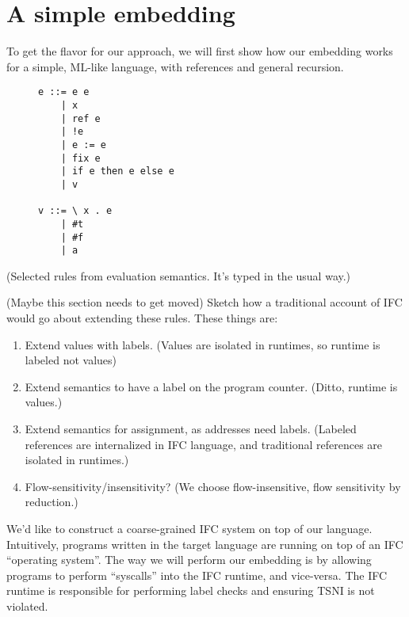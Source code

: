 \section{A simple embedding}
\label{sec:example}

To get the flavor for our approach, we will first show how our embedding
works for a simple, ML-like language, with references and general recursion.

\begin{figure}
\begin{verbatim}
e ::= e e
    | x
    | ref e
    | !e
    | e := e
    | fix e
    | if e then e else e
    | v

v ::= \ x . e
    | #t
    | #f
    | a
\end{verbatim}
\label{fig:ml}
\end{figure}

(Selected rules from evaluation semantics. It's typed in the usual way.)

(Maybe this section needs to get moved) Sketch how a traditional account
of IFC would go about extending these rules.  These things are:

\begin{enumerate}
    \item Extend values with labels. (Values are isolated in runtimes,
        so runtime is labeled not values)
    \item Extend semantics to have a label on the program counter.
        (Ditto, runtime is values.)
    \item Extend semantics for assignment, as addresses need labels.
        (Labeled references are internalized in IFC language, and
        traditional references are isolated in runtimes.)
    \item Flow-sensitivity/insensitivity? (We choose flow-insensitive,
        flow sensitivity by reduction.)
\end{enumerate}


We'd like to construct a coarse-grained IFC system on top of our language.
Intuitively, programs written in the target language are running on top of
an IFC ``operating system''.  The way we will perform our embedding is
by allowing programs to perform ``syscalls'' into the IFC runtime, and
vice-versa.  The IFC runtime is responsible for performing label checks
and ensuring TSNI is not violated.

